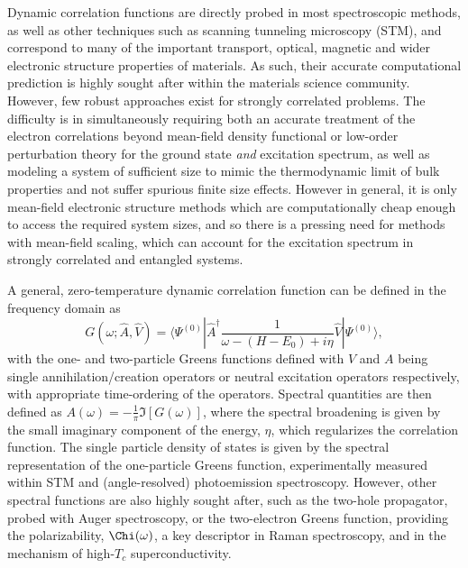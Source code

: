 \documentclass[aps,showpacs,twocolumn,nobibnotes]{revtex4}
\begin{document}
Dynamic correlation functions are directly probed in most spectroscopic methods, as well as other techniques such as scanning tunneling microscopy (STM), 
and correspond to many of the important transport, optical, magnetic and wider electronic structure properties of materials. 
As such, their accurate computational prediction is highly sought after within the materials science community. 
However, few robust approaches exist for strongly correlated problems\cite{Gali2013}. The difficulty is in simultaneously requiring both an accurate 
treatment of the electron correlations beyond mean-field density functional or low-order perturbation theory for the ground state {\em and} excitation spectrum, as well as modeling 
a system of sufficient size to mimic the thermodynamic limit of bulk properties and not suffer spurious finite size effects. 
However in general, it is only mean-field electronic structure methods which are computationally cheap enough to access the required system
sizes, and so there is a pressing need for methods with mean-field scaling, which can account for the excitation spectrum in strongly correlated 
and entangled systems.

A general, zero-temperature dynamic correlation function can be defined in the frequency domain as
\begin{equation}
    G(\omega;{\hat A},{\hat V}) = \langle \Psi^{(0)} | {\hat A}^{\dagger} \frac{1}{\omega-(H-E_0)+i \eta} {\hat V} | \Psi^{(0)} \rangle , \label{eqn:intCorrFunc}
\end{equation}
with the one- and two-particle Greens functions defined with $V$ and $A$ being single annihilation/creation operators or neutral excitation
operators respectively, with appropriate time-ordering of the operators. Spectral quantities are then defined as $A(\omega)=-\frac{1}{\pi}\Im[G(\omega)]$,
where the spectral broadening is given by the small imaginary component of the energy, $\eta$, which regularizes the correlation function. The single particle
density of states is given by the spectral representation of the one-particle Greens function, experimentally measured within STM 
and (angle-resolved) photoemission spectroscopy. However, other spectral functions are also highly sought after, such as the two-hole propagator, 
probed with Auger spectroscopy\cite{Mona2013}, or the two-electron Greens function, providing the polarizability, $\Chi(\omega)$, a key descriptor in 
Raman spectroscopy, and in the mechanism of high-$T_c$ superconductivity\cite{Millis2012,Sordi2012,Millis2013}.
\end{document}
